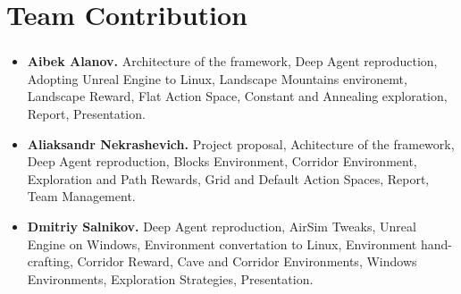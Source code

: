 \documentclass[t]{beamer}
\begin{document}
\section{Team Contribution}
\begin{frame}
	\frametitle{\insertsection}
	\begin{itemize}
    \item {\bf Aibek Alanov.} Architecture of the framework, Deep Agent reproduction,
        Adopting Unreal Engine to Linux, Landscape Mountains environemt,
        Landscape Reward, Flat Action Space, Constant and Annealing exploration,
        Report, Presentation.

    \item {\bf Aliaksandr Nekrashevich.} Project proposal, Achitecture of
        the framework, Deep Agent reproduction, Blocks Environment,
        Corridor Environment, Exploration and Path Rewards,
        Grid and Default Action Spaces, Report, Team Management.

    \item {\bf Dmitriy Salnikov.} Deep Agent reproduction, AirSim Tweaks,
        Unreal Engine on Windows, Environment convertation to Linux,
        Environment hand-crafting, Corridor Reward, Cave and Corridor
        Environments, Windows Environments, Exploration Strategies,
        Presentation.
\end{itemize}
\end{frame}
\end{document}
